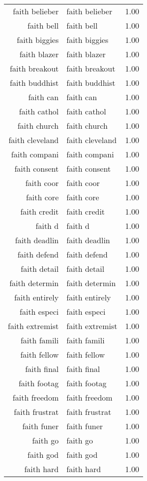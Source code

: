 \begin{table}[ht]
\begin{tabular}{rlr}
  faith belieber & faith belieber & 1.00 \\ 
  faith bell & faith bell & 1.00 \\ 
  faith biggies & faith biggies & 1.00 \\ 
  faith blazer & faith blazer & 1.00 \\ 
  faith breakout & faith breakout & 1.00 \\ 
  faith buddhist & faith buddhist & 1.00 \\ 
  faith can & faith can & 1.00 \\ 
  faith cathol & faith cathol & 1.00 \\ 
  faith church & faith church & 1.00 \\ 
  faith cleveland & faith cleveland & 1.00 \\ 
  faith compani & faith compani & 1.00 \\ 
  faith consent & faith consent & 1.00 \\ 
  faith coor & faith coor & 1.00 \\ 
  faith core & faith core & 1.00 \\ 
  faith credit & faith credit & 1.00 \\ 
  faith d & faith d & 1.00 \\ 
  faith deadlin & faith deadlin & 1.00 \\ 
  faith defend & faith defend & 1.00 \\ 
  faith detail & faith detail & 1.00 \\ 
  faith determin & faith determin & 1.00 \\ 
  faith entirely & faith entirely & 1.00 \\ 
  faith especi & faith especi & 1.00 \\ 
  faith extremist & faith extremist & 1.00 \\ 
  faith famili & faith famili & 1.00 \\ 
  faith fellow & faith fellow & 1.00 \\ 
  faith final & faith final & 1.00 \\ 
  faith footag & faith footag & 1.00 \\ 
  faith freedom & faith freedom & 1.00 \\ 
  faith frustrat & faith frustrat & 1.00 \\ 
  faith funer & faith funer & 1.00 \\ 
  faith go & faith go & 1.00 \\ 
  faith god & faith god & 1.00 \\ 
  faith hard & faith hard & 1.00 \\ 

\end{tabular}
\end{table}
